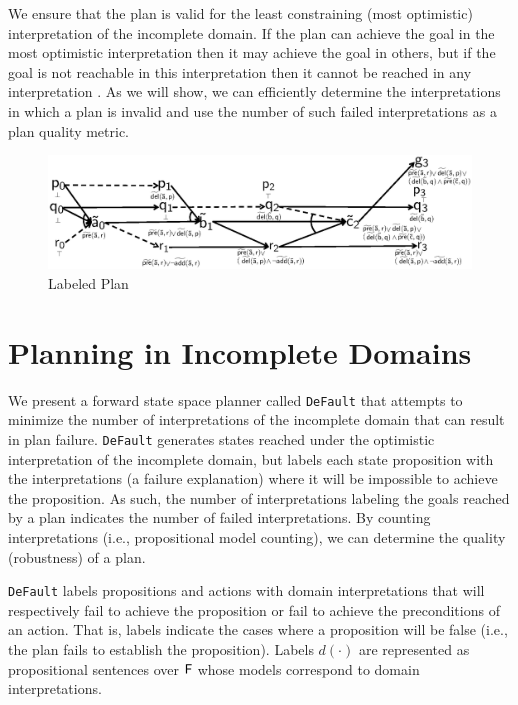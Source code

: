 \documentclass[letterpaper]{article}
\def\default{{\tt DeFault}}
\def\citep#1{\cite{#1}}
\begin{document}
We ensure that the plan is valid for the least constraining (most optimistic)
interpretation of the incomplete domain. If the plan can achieve the goal in the
most optimistic interpretation then it may achieve the goal in others, but if
the goal is not reachable in this interpretation then it cannot be reached in
any interpretation \citep{USU-CS-TR-11-001}.  As we will show, we can
efficiently determine the interpretations in which a plan is invalid and use the
number of such failed interpretations as a plan quality metric.


\begin{figure}[t]\centering
\vspace*{-1cm}
\includegraphics[width=1\linewidth]{WeberBryceICAPS11Fig1.eps}
\vspace*{-1cm}\caption{\label{fig:example} Labeled Plan}
\end{figure}



\section{Planning in Incomplete Domains}

We present a forward state space planner called \default{} that attempts to
minimize the number of interpretations of the incomplete domain that can result
in plan failure.  \default{} generates states reached under the optimistic
interpretation of the incomplete domain, but labels each state proposition with
the interpretations (a failure explanation) where it will be impossible to
achieve the proposition. As such, the number of interpretations labeling the
goals reached by a plan indicates the number of failed interpretations.  By
counting interpretations (i.e., propositional model counting), we can determine
the quality (robustness) of a plan.

\default{} labels propositions and actions with domain interpretations that will
respectively fail to achieve the proposition or fail to achieve the
preconditions of an action.  That is, labels indicate the cases where a
proposition will be false (i.e., the plan fails to establish the proposition). 
Labels $d(\cdot)$ are represented as  propositional sentences over ${\sf F}$
whose models correspond to domain interpretations.
\end{document}
